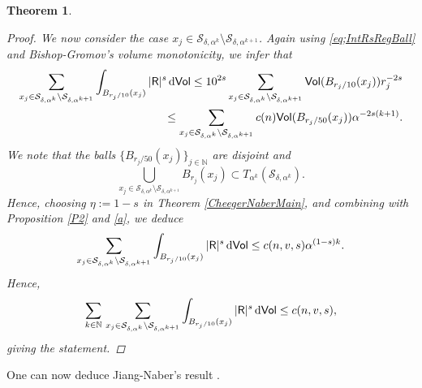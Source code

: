 \documentclass[10pt]{article}
\newtheorem{thm}{Theorem}[section]
\theoremstyle{definition}
\newcommand{\bb}[1]{\mathbb{#1}}
\newcommand{\ssf}[1]{\mathsf{#1}}
\newcommand{\R}{\mathsf{R}}
\newcommand{\de}{{\rm d}}
\begin{document}
\begin{thm}
\begin{proof}
    We now consider the case $x_j \in \mathcal{S}_{\delta,\alpha^{k}} \setminus \mathcal{S}_{\delta,\alpha^{k+1}}$.  Again using  \eqref{eq;IntRsRegBall} and Bishop-Gromov's volume monotonicity, we infer that
    \begin{align} \label{a}
    \nonumber
      \sum_{x_j \in \mathcal{S}_{\delta,\alpha^{k}} \setminus \mathcal{S}_{\delta,\alpha^{k+1}}}
    \int_{B_{r_j/10}(x_j)} |\R|^s \,\de\ssf{Vol}  \leq  
     10^{2s}\sum_{x_j \in \mathcal{S}_{\delta,\alpha^{k}} \setminus \mathcal{S}_{\delta,\alpha^{k+1}}}
   \ssf{Vol}(B_{r_j/10}(x_j)) r_j^{-2s} \\
    \leq 
   \sum_{x_j \in \mathcal{S}_{\delta,\alpha^{k}} \setminus \mathcal{S}_{\delta,\alpha^{k+1}}}
   c(n) \ssf{Vol}(B_{r_j/50}(x_j)) \alpha^{-2s(k+1)}.  
    \end{align}
    We note that the balls $\{B_{r_j/50}(x_j)\}_{j \in \bb{N}}$ are disjoint and 
    \[
    \bigcup_{x_j \in \mathcal{S}_{\delta,\alpha^{k}} \setminus \mathcal{S}_{\delta,\alpha^{k+1}}} B_{r_j}(x_j) \subset T_{\alpha^k}(\mathcal{S}_{\delta,\alpha^{k}} ).
    \]
    Hence, choosing $\eta:=1-s$ in Theorem \ref{CheegerNaberMain}, and combining with Proposition \ref{P2} and \eqref{a}, we deduce 
    \[
     \sum_{x_j \in \mathcal{S}_{\delta,\alpha^{k}} \setminus \mathcal{S}_{\delta,\alpha^{k+1}}}
    \int_{B_{r_j/10}(x_j)} |\R|^s \,\de\ssf{Vol}  \leq c(n,v,s) \alpha^{(1-s)k}.
    \]
    Hence,
    \[
    \sum_{k \in \bb{N}} \, \sum_{x_j \in \mathcal{S}_{\delta,\alpha^{k}} \setminus \mathcal{S}_{\delta,\alpha^{k+1}}}
    \int_{B_{r_j/10}(x_j)} |\R|^s \,\de\ssf{Vol} \leq c(n,v,s),
    \]
    giving the statement.
    \end{proof}
\end{thm}

One can now deduce   Jiang-Naber's result \cite[Theorem 2.17]{Naberconjectures}.
\end{document}
